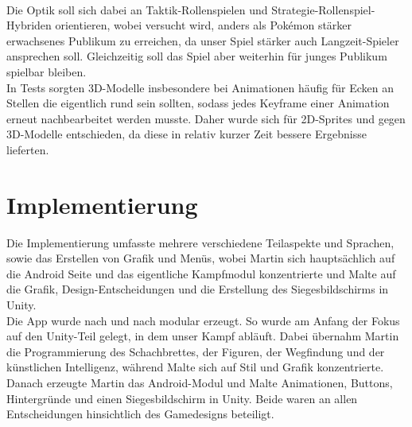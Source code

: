 \documentclass[extern,palatino]{cgBA}
\begin{document}
\\Die Optik soll sich dabei an Taktik-Rollenspielen und Strategie-Rollenspiel-Hybriden orientieren, wobei versucht wird, anders als Pokémon stärker erwachsenes Publikum zu erreichen, da unser Spiel stärker auch Langzeit-Spieler ansprechen soll. Gleichzeitig soll das Spiel aber weiterhin für junges Publikum spielbar bleiben.
\\In Tests sorgten 3D-Modelle insbesondere bei Animationen häufig für Ecken an Stellen die eigentlich rund sein sollten, sodass jedes Keyframe einer Animation erneut nachbearbeitet werden musste. Daher wurde sich für 2D-Sprites und gegen 3D-Modelle entschieden, da diese in relativ kurzer Zeit bessere Ergebnisse lieferten.
\newpage
\section{Implementierung}
Die Implementierung umfasste mehrere verschiedene Teilaspekte und Sprachen, sowie das Erstellen von Grafik und Menüs, wobei Martin sich hauptsächlich auf die Android Seite und das eigentliche Kampfmodul konzentrierte und Malte auf die Grafik, Design-Entscheidungen und die Erstellung des Siegesbildschirms in Unity.
\\Die App wurde nach und nach modular erzeugt. So wurde am Anfang der Fokus auf den Unity-Teil gelegt, in dem unser Kampf abläuft. Dabei übernahm Martin die Programmierung des Schachbrettes, der Figuren, der Wegfindung und der künstlichen Intelligenz, während Malte sich auf Stil und Grafik konzentrierte. Danach erzeugte Martin das Android-Modul und Malte Animationen, Buttons, Hintergründe und einen Siegesbildschirm in Unity. Beide waren an allen Entscheidungen hinsichtlich des Gamedesigns beteiligt.
\end{document}
